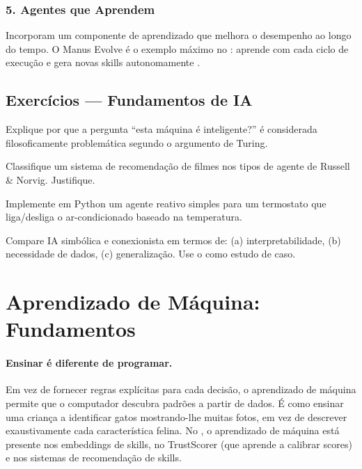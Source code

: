 \subsubsection*{5. Agentes que Aprendem}
Incorporam um componente de aprendizado que melhora o desempenho ao longo
do tempo. O Manus Evolve é o exemplo máximo no \opencodeeco{}:
aprende com cada ciclo de execução e gera novas skills
autonomamente \cite{opencode2026manus}.
\subsection{Exercícios — Fundamentos de IA}
\begin{exercicio}[Nivel 0]
Explique por que a pergunta ``esta máquina é inteligente?'' é considerada
filosoficamente problemática segundo o argumento de Turing.
\end{exercicio}
\begin{exercicio}
Classifique um sistema de recomendação de filmes nos tipos de agente de
Russell \& Norvig. Justifique.
\end{exercicio}
\begin{exercicio}
Implemente em Python um agente reativo simples para um termostato que
liga/desliga o ar-condicionado baseado na temperatura.
\end{exercicio}
\begin{exercicio}
Compare IA simbólica e conexionista em termos de: (a) interpretabilidade,
(b) necessidade de dados, (c) generalização. Use o \opencodeeco{} como
estudo de caso.
\end{exercicio}
\section{Aprendizado de Máquina: Fundamentos}
\label{sec:aprendizado-maquina}
\nivelbasico

\paragraph{Ensinar é diferente de programar.} Em vez de fornecer regras
explícitas para cada decisão, o aprendizado de máquina permite que o
computador descubra padrões a partir de dados. É como ensinar uma criança a
identificar gatos mostrando-lhe muitas fotos, em vez de descrever
exaustivamente cada característica felina. No \opencodeeco{}, o aprendizado
de máquina está presente nos embeddings de skills, no TrustScorer (que
aprende a calibrar scores) e nos sistemas de recomendação de skills.

